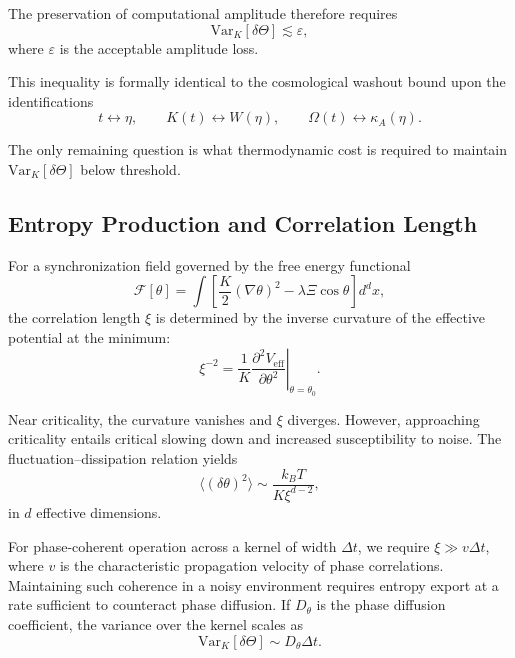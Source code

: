 \documentclass[12pt]{article}
\begin{document}
The preservation of computational amplitude therefore requires
\begin{equation}
\mathrm{Var}_K[\delta\Theta]
\lesssim
\varepsilon,
\end{equation}
where $\varepsilon$ is the acceptable amplitude loss.

This inequality is formally identical to the cosmological washout bound upon the identifications
\begin{equation}
t \leftrightarrow \eta,
\qquad
K(t) \leftrightarrow W(\eta),
\qquad
\Omega(t) \leftrightarrow \kappa_A(\eta).
\end{equation}

The only remaining question is what thermodynamic cost is required to maintain $\mathrm{Var}_K[\delta\Theta]$ below threshold.

\subsection*{Entropy Production and Correlation Length}

For a synchronization field governed by the free energy functional
\begin{equation}
\mathcal{F}[\theta]
=
\int
\left[
\frac{K}{2} (\nabla \theta)^2
-
\lambda \Xi \cos \theta
\right] d^dx,
\end{equation}
the correlation length $\xi$ is determined by the inverse curvature of the effective potential at the minimum:
\begin{equation}
\xi^{-2}
=
\frac{1}{K}
\left.
\frac{\partial^2 V_{\mathrm{eff}}}{\partial \theta^2}
\right|_{\theta=\theta_0}.
\end{equation}

Near criticality, the curvature vanishes and $\xi$ diverges. However, approaching criticality entails critical slowing down and increased susceptibility to noise. The fluctuation--dissipation relation yields
\begin{equation}
\langle (\delta\theta)^2 \rangle
\sim
\frac{k_B T}{K \xi^{d-2}},
\end{equation}
in $d$ effective dimensions.

For phase-coherent operation across a kernel of width $\Delta t$, we require $\xi \gg v \Delta t$, where $v$ is the characteristic propagation velocity of phase correlations. Maintaining such coherence in a noisy environment requires entropy export at a rate sufficient to counteract phase diffusion. If $D_\theta$ is the phase diffusion coefficient, the variance over the kernel scales as
\begin{equation}
\mathrm{Var}_K[\delta\Theta]
\sim
D_\theta \Delta t.
\end{equation}
\end{document}
